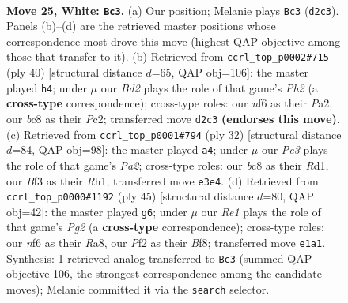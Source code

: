 \documentclass[11pt]{article}
\begin{document}
\clearpage

\begin{figure}[p]\centering
\begin{subfigure}{0.46\textwidth}\centering
\resizebox{\linewidth}{!}{%
\newchessgame
\chessboard[
  setfen={1rb2r2/p3np1k/1p2pnpp/2P5/1RP5/N3PB1P/P2B1PP1/4RK2 w - - 8 25},
  showmover=false,
  pgfstyle=straightmove, color=movearrow, markmove={d2-c3}
]}
\caption{}
\end{subfigure}\hfill
\begin{subfigure}{0.46\textwidth}\centering
\resizebox{\linewidth}{!}{%
\newchessgame
\chessboard[
  setfen={r1br2k1/5pp1/2p1pn1p/p2p4/N3P1P1/5P2/PPPRB2P/2K2R2 w - - 0 21},
  showmover=false,
  pgfstyle=straightmove, color=movearrow, markmove={h2-h4}
]}
\caption{}
\end{subfigure}
\\[4pt]
\begin{subfigure}{0.46\textwidth}\centering
\resizebox{\linewidth}{!}{%
\newchessgame
\chessboard[
  setfen={4k2r/p2rbppp/1p2p3/n1p5/2PP1P2/2P1B3/P1K1BP1P/3R3R w k - 2 17},
  showmover=false,
  pgfstyle=straightmove, color=movearrow, markmove={a2-a4}
]}
\caption{}
\end{subfigure}\hfill
\begin{subfigure}{0.46\textwidth}\centering
\resizebox{\linewidth}{!}{%
\newchessgame
\chessboard[
  setfen={r3rbk1/1b3pp1/2pp1n2/p6p/NpPNP2P/1P4P1/P3RPB1/R5K1 b - - 1 23},
  showmover=false,
  pgfstyle=straightmove, color=movearrow, markmove={g7-g6}
]}
\caption{}
\end{subfigure}
\caption{\textbf{Move 25, White: \texttt{Bc3}.} (a) Our position; Melanie plays \texttt{Bc3} (\texttt{d2c3}). Panels (b)--(d) are the retrieved master positions whose correspondence most drove this move (highest QAP objective among those that transfer to it). (b) Retrieved from \texttt{ccrl\_top\_p0002\#715} (ply 40) [structural distance $d$=65, QAP obj=106]: the master played \texttt{h4}; under $\mu$ our \emph{Bd2} plays the role of that game's \emph{Ph2} (a \textbf{cross-type} correspondence); cross-type roles: our \emph{n}f6 as their \emph{P}a2, our \emph{b}c8 as their \emph{P}c2; transferred move \texttt{d2c3} \textbf{(endorses this move)}. (c) Retrieved from \texttt{ccrl\_top\_p0001\#794} (ply 32) [structural distance $d$=84, QAP obj=98]: the master played \texttt{a4}; under $\mu$ our \emph{Pe3} plays the role of that game's \emph{Pa2}; cross-type roles: our \emph{b}c8 as their \emph{R}d1, our \emph{B}f3 as their \emph{R}h1; transferred move \texttt{e3e4}. (d) Retrieved from \texttt{ccrl\_top\_p0000\#1192} (ply 45) [structural distance $d$=80, QAP obj=42]: the master played \texttt{g6}; under $\mu$ our \emph{Re1} plays the role of that game's \emph{Pg2} (a \textbf{cross-type} correspondence); cross-type roles: our \emph{n}f6 as their \emph{R}a8, our \emph{P}f2 as their \emph{B}f8; transferred move \texttt{e1a1}. Synthesis: 1 retrieved analog transferred to \texttt{Bc3} (summed QAP objective 106, the strongest correspondence among the candidate moves); Melanie committed it via the \texttt{search} selector.}
\label{fig:thought-m48}
\end{figure}
\end{document}
